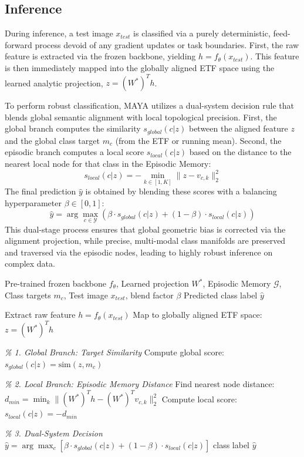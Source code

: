 \subsection{Inference}
\label{sec:method_inference}
During inference, a test image $x_{test}$ is classified via a purely deterministic, feed-forward process devoid of any gradient updates or task boundaries. First, the raw feature is extracted via the frozen backbone, yielding $h = f_\theta(x_{test})$. This feature is then immediately mapped into the globally aligned ETF space using the learned analytic projection, $z = (W^*)^T h$. 

To perform robust classification, MAYA utilizes a dual-system decision rule that blends global semantic alignment with local topological precision. First, the global branch computes the similarity $s_{global}(c|z)$ between the aligned feature $z$ and the global class target $m_c$ (from the ETF or running mean). Second, the episodic branch computes a local score $s_{local}(c|z)$ based on the distance to the nearest local node for that class in the Episodic Memory:
\begin{equation}
    s_{local}(c|z) = - \min_{k \in [1, K]} \| z - v_{c,k} \|_2^2
\end{equation}
The final prediction $\hat{y}$ is obtained by blending these scores with a balancing hyperparameter $\beta \in [0, 1]$:
\begin{equation}
    \hat{y} = \arg\max_{c \in \mathcal{Y}} \left( \beta \cdot s_{global}(c|z) + (1 - \beta) \cdot s_{local}(c|z) \right)
    \label{eq:blend}
\end{equation}
This dual-stage process ensures that global geometric bias is corrected via the alignment projection, while precise, multi-modal class manifolds are preserved and traversed via the episodic nodes, leading to highly robust inference on complex data.

\begin{algorithm}[htbp]
\caption{MAYA: Inference Phase}
\label{alg:maya_infer}
\begin{algorithmic}[1]
\REQUIRE Pre-trained frozen backbone $f_\theta$, Learned projection $W^*$, Episodic Memory $\mathcal{G}$, Class targets $m_c$, Test image $x_{test}$, blend factor $\beta$
\ENSURE Predicted class label $\hat{y}$

\STATE Extract raw feature $h = f_\theta(x_{test})$
\STATE Map to globally aligned ETF space: $z = (W^*)^T h$

\STATE \textit{\% 1. Global Branch: Target Similarity}
    \STATE Compute global score: $s_{global}(c|z) = \text{sim}(z, m_c)$
\ENDFOR

\STATE \textit{\% 2. Local Branch: Episodic Memory Distance}
    \STATE Find nearest node distance: $d_{min} = \min_{k} \| (W^*)^T h - (W^*)^T v_{c,k} \|_2^2$
    \STATE Compute local score: $s_{local}(c|z) = - d_{min}$
\ENDFOR

\STATE \textit{\% 3. Dual-System Decision}
\STATE $\hat{y} = \arg\max_{c} \left[ \beta \cdot s_{global}(c|z) + (1 - \beta) \cdot s_{local}(c|z) \right]$
\RETURN class label $\hat{y}$

\end{algorithmic}
\end{algorithm}